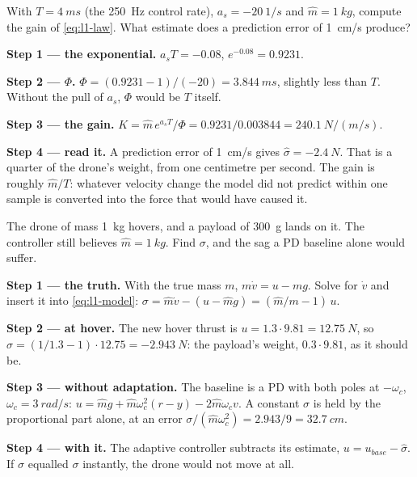 \begin{example}
\label{ex:l1-step}
With $T = \SI{4}{ms}$ (the \SI{250}{Hz} control rate), $a_s = \SI{-20}{1/s}$ and $\hat m = \SI{1}{kg}$, compute the gain of \cref{eq:l1-law}. What estimate does a prediction error of \SI{1}{cm/s} produce?

\textbf{Step 1 — the exponential.} $a_sT = -0.08$, $e^{-0.08} = 0.9231$.

\textbf{Step 2 — $\Phi$.} $\Phi = (0.9231 - 1)/(-20) = \SI{3.844}{ms}$, slightly less than $T$. Without the pull of $a_s$, $\Phi$ would be $T$ itself.

\textbf{Step 3 — the gain.} $K = \hat m\,e^{a_sT}/\Phi = 0.9231/0.003844 = \SI{240.1}{N\per(m/s)}$.

\textbf{Step 4 — read it.} A prediction error of \SI{1}{cm/s} gives $\hat\sigma = \SI{-2.4}{N}$. That is a quarter of the drone's weight, from one centimetre per second. The gain is roughly $\hat m/T$: whatever velocity change the model did not predict within one sample is converted into the force that would have caused it.
\end{example}

\begin{example}
\label{ex:l1-payload}
The drone of mass \SI{1}{kg} hovers, and a payload of \SI{300}{g} lands on it. The controller still believes $\hat m = \SI{1}{kg}$. Find $\sigma$, and the sag a PD baseline alone would suffer.

\textbf{Step 1 — the truth.} With the true mass $m$, $m\dot v = u - mg$. Solve for $\dot v$ and insert it into \cref{eq:l1-model}: $\sigma = \hat m\dot v - (u - \hat mg) = (\hat m/m - 1)\,u$.

\textbf{Step 2 — at hover.} The new hover thrust is $u = 1.3 \cdot 9.81 = \SI{12.75}{N}$, so $\sigma = (1/1.3 - 1)\cdot 12.75 = \SI{-2.943}{N}$: the payload's weight, $0.3 \cdot 9.81$, as it should be.

\textbf{Step 3 — without adaptation.} The baseline is a PD with both poles at $-\omega_c$, $\omega_c = \SI{3}{rad/s}$: $u = \hat mg + \hat m\omega_c^2(r - y) - 2\hat m\omega_c v$. A constant $\sigma$ is held by the proportional part alone, at an error $\sigma/(\hat m\omega_c^2) = 2.943/9 = \SI{32.7}{cm}$.

\textbf{Step 4 — with it.} The adaptive controller subtracts its estimate, $u = u_{base} - \hat\sigma$. If $\hat\sigma$ equalled $\sigma$ instantly, the drone would not move at all.
\end{example}

